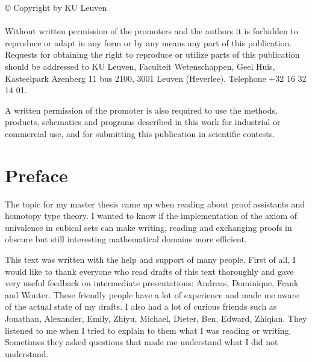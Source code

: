 \documentclass[12pt,a4paper,twoside,xetex]{book} %
\begin{document}
\rmfamily



\thispagestyle{empty}



\null

\vfill

\begin{footnotesize}
© Copyright by KU Leuven \\ \\

Without written permission of the promoters and the authors it is forbidden to reproduce or adapt in any form or by any means any part of this publication. Requests for obtaining the right to reproduce or utilize parts of this publication should be addressed to KU Leuven, Faculteit Wetenschappen, Geel Huis, Kasteelpark Arenberg 11 bus 2100, 3001 Leuven (Heverlee), Telephone +32 16 32 14 01.

A written permission of the promoter is also required to use the methods, products, schematics and programs described in this work for industrial or commercial use, and for submitting this publication in scientific contests.
\end{footnotesize}


\clearpage 

\clearpage

\setcounter{page}{0}

\setsansfont{CMU Sans Serif}  

\chapter*{Preface}

The topic for my master thesis came up when reading about proof assistants and homotopy type theory. I wanted to know if the implementation of the axiom of 
univalence in cubical sets can make writing, reading and exchanging proofs in obscure but still interesting mathematical domains more efficient.

This text was written with the help and support of many people. First of all, I 
would like to thank everyone who read drafts of this text thoroughly and gave 
very useful feedback on intermediate presentations: Andreas, Dominique, Frank and Wouter. These friendly people have a lot of experience and made me aware of the actual state of my drafts. I also had a lot of curious friends such as Jonathan, Alexander, Emily, Zhiyu, Michael, Dieter, Ben, Edward, Zhiqian.  They listened to me when I tried to explain to them what I was reading or writing. Sometimes they asked questions 
that made me understand what I did not understand.
\\
\end{document}
